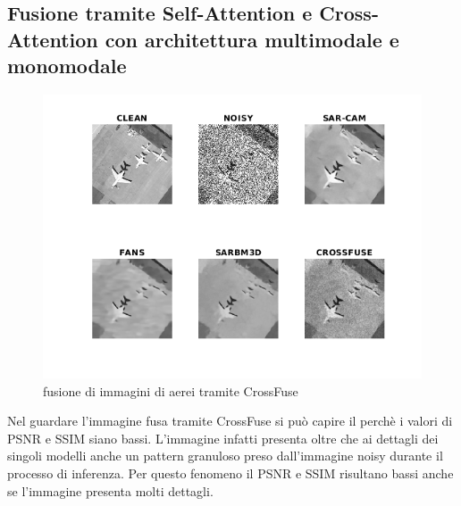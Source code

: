\subsection{Fusione tramite Self-Attention e Cross-Attention con architettura multimodale e monomodale} 
\begin{figure}[H] 
  \centering
  \includegraphics[width=1.1\textwidth]{utils/CFairplane00.png}
  \caption{fusione di immagini di aerei tramite CrossFuse}
  \label{fig:airplane00CF}
\end{figure}
Nel guardare l'immagine fusa tramite CrossFuse si può capire il perchè i valori di PSNR e SSIM siano bassi.
L'immagine infatti presenta oltre che ai dettagli dei singoli modelli anche un pattern granuloso preso dall'immagine noisy 
durante il processo di inferenza. Per questo fenomeno il PSNR e SSIM risultano bassi anche se l'immagine presenta molti dettagli.

